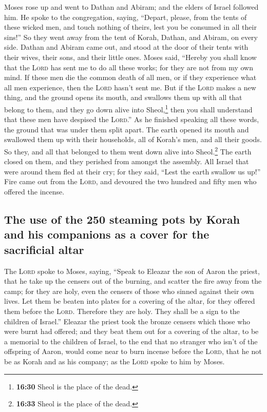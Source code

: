  Moses rose up and went to Dathan and Abiram; and the
elders of Israel followed him.  He spoke to the
congregation, saying, ``Depart, please, from the tents of these wicked
men, and touch nothing of theirs, lest you be consumed in all their
sins!''  So they went away from the tent of Korah,
Dathan, and Abiram, on every side. Dathan and Abiram came out, and stood
at the door of their tents with their wives, their sons, and their
little ones.  Moses said, ``Hereby you shall know that
the \textsc{Lord} has sent me to do all these works; for they are not
from my own mind.  If these men die the common death of
all men, or if they experience what all men experience, then the
\textsc{Lord} hasn't sent me.  But if the \textsc{Lord}
makes a new thing, and the ground opens its mouth, and swallows them up
with all that belong to them, and they go down alive into
Sheol,\footnote{\textbf{16:30} Sheol is the place of the dead.} then you
shall understand that these men have despised the \textsc{Lord}.''
 As he finished speaking all these words, the ground that
was under them split apart.  The earth opened its mouth
and swallowed them up with their households, all of Korah's men, and all
their goods.  So they, and all that belonged to them went
down alive into Sheol.\footnote{\textbf{16:33} Sheol is the place of the
  dead.} The earth closed on them, and they perished from amongst the
assembly.  All Israel that were around them fled at their
cry; for they said, ``Lest the earth swallow us up!'' 
Fire came out from the \textsc{Lord}, and devoured the two hundred and
fifty men who offered the incense.

\hypertarget{the-use-of-the-250-steaming-pots-by-korah-and-his-companions-as-a-cover-for-the-sacrificial-altar}{%
\subsection{The use of the 250 steaming pots by Korah and his companions
as a cover for the sacrificial
altar}\label{the-use-of-the-250-steaming-pots-by-korah-and-his-companions-as-a-cover-for-the-sacrificial-altar}}

 The \textsc{Lord} spoke to Moses, saying,
 ``Speak to Eleazar the son of Aaron the priest, that he
take up the censers out of the burning, and scatter the fire away from
the camp; for they are holy,  even the censers of those
who sinned against their own lives. Let them be beaten into plates for a
covering of the altar, for they offered them before the \textsc{Lord}.
Therefore they are holy. They shall be a sign to the children of
Israel.''  Eleazar the priest took the bronze censers
which those who were burnt had offered; and they beat them out for a
covering of the altar,  to be a memorial to the children
of Israel, to the end that no stranger who isn't of the offspring of
Aaron, would come near to burn incense before the \textsc{Lord}, that he
not be as Korah and as his company; as the \textsc{Lord} spoke to him by
Moses.

